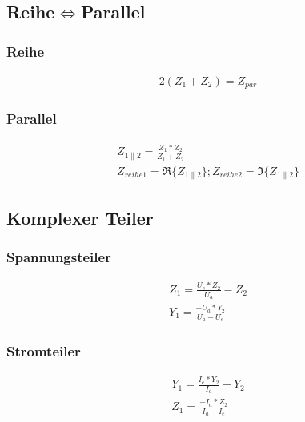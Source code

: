 \documentclass[10pt,a5paper]{article}
\begin{document}
 \subsection{Reihe\ensuremath{\Leftrightarrow}Parallel}
 \subsubsection{Reihe}
 \begin{eqnarray}
 2(Z_1+Z_2)=Z_{par}
 \end{eqnarray}
 \subsubsection{Parallel}
 \begin{eqnarray}
 Z_{1\parallel 2}=\frac{Z_1*Z_2}{Z_1+Z_2}\\
 Z_{reihe1}=\Re\{Z_{1\parallel 2}\};Z_{reihe2}=\Im\{Z_{1\parallel 2}\}
 \end{eqnarray}
 \subsection{Komplexer Teiler}
 \subsubsection{Spannungsteiler}
 \begin{eqnarray}
 Z_1=\frac{U_e*Z_2}{U_a}-Z_2\\
 Y_1=\frac{-U_a*Y_2}{U_a-U_e}
 \end{eqnarray}
 \subsubsection{Stromteiler}
 \begin{eqnarray}
 Y_1=\frac{I_e*Y_2}{I_a}-Y_2\\
  Z_1=\frac{-I_a*Z_2}{I_a-I_e}
  \end{eqnarray}
\end{document}
